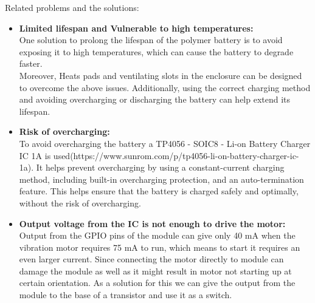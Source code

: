 \documentclass{article}
\begin{document}
        Related problems and the solutions:
        \begin{itemize}
            \item \textbf{Limited lifespan and Vulnerable to high temperatures:}\\
            One solution to prolong the lifespan of the polymer battery is to avoid exposing it to high temperatures, which can cause the battery to degrade faster.  \\
            Moreover, Heats pads and ventilating slots in the enclosure can be designed to overcome the above issues. Additionally, using the correct charging method and avoiding overcharging or discharging the battery can help extend its lifespan.

            \item \textbf{Risk of overcharging:}\\ 
            To avoid overcharging the battery a TP4056 - SOIC8 - Li-on Battery Charger IC 1A is used(https://www.sunrom.com/p/tp4056-li-on-battery-charger-ic-1a). It helps prevent overcharging by using a constant-current charging method, including built-in overcharging protection, and an auto-termination feature. This helps ensure that the battery is charged safely and optimally, without the risk of overcharging.

            \begin{figure}[!htb]
                \centering
            \end{figure}
            
            \item \textbf{Output voltage from the IC is not enough to drive the motor:}\\
            Output from the GPIO pins of the module can give only 40 mA when the vibration motor requires 75 mA to run, which means to start it requires an even larger current. Since connecting the motor directly to module can damage the module as well as it might result in motor not starting up at certain orientation. As a solution for this we can give the output from the module to the base of a transistor and use it as a switch.
        \end{itemize}
  
\end{document}
